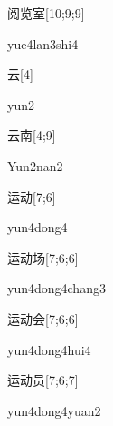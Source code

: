 \begin{verbete}{阅览室}[10;9;9]
\begin{pronuncia}{yue4lan3shi4}
\end{pronuncia}
\end{verbete}

\begin{verbete}[yun2]{云}[4]
\begin{pronuncia}{yun2}
\end{pronuncia}
\end{verbete}

\begin{verbete}{云南}[4;9]
\begin{pronuncia}{Yun2nan2}
\end{pronuncia}
\end{verbete}

\begin{verbete}{运动}[7;6]
\begin{pronuncia}{yun4dong4}
\end{pronuncia}
\end{verbete}

\begin{verbete}{运动场}[7;6;6]
\begin{pronuncia}[\\]{yun4dong4chang3}
\end{pronuncia}
\end{verbete}

\begin{verbete}{运动会}[7;6;6]
\begin{pronuncia}{yun4dong4hui4}
\end{pronuncia}
\end{verbete}

\begin{verbete}{运动员}[7;6;7]
\begin{pronuncia}[\\]{yun4dong4yuan2}
\end{pronuncia}
\end{verbete}

